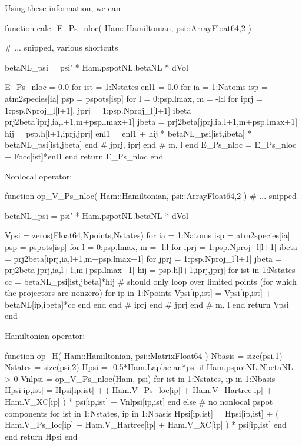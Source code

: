 Using these information, we can
\begin{juliacode}
function calc_E_Ps_nloc( Ham::Hamiltonian, psi::Array{Float64,2} )
  
  # ... snipped, various shortcuts

  betaNL_psi = psi' * Ham.pspotNL.betaNL * dVol

  E_Ps_nloc = 0.0
  for ist = 1:Nstates
    enl1 = 0.0
    for ia = 1:Natoms
      isp = atm2species[ia]
      psp = pspots[isp]
      for l = 0:psp.lmax, m = -l:l
        for iprj = 1:psp.Nproj_l[l+1], jprj = 1:psp.Nproj_l[l+1]
          ibeta = prj2beta[iprj,ia,l+1,m+psp.lmax+1]
          jbeta = prj2beta[jprj,ia,l+1,m+psp.lmax+1]
          hij = psp.h[l+1,iprj,jprj]
          enl1 = enl1 + hij * betaNL_psi[ist,ibeta] * betaNL_psi[ist,jbeta]
        end # jprj, iprj
      end # m, l
    end
    E_Ps_nloc = E_Ps_nloc + Focc[ist]*enl1
  end
  return E_Ps_nloc
end
\end{juliacode}

Nonlocal operator:
\begin{juliacode}
function op_V_Ps_nloc( Ham::Hamiltonian, psi::Array{Float64,2} )
  # ... snipped

  betaNL_psi = psi' * Ham.pspotNL.betaNL * dVol
  
  Vpsi = zeros(Float64,Npoints,Nstates)
  for ia = 1:Natoms
    isp = atm2species[ia]
    psp = pspots[isp]
    for l = 0:psp.lmax, m = -l:l
      for iprj = 1:psp.Nproj_l[l+1]
        ibeta = prj2beta[iprj,ia,l+1,m+psp.lmax+1]
        for jprj = 1:psp.Nproj_l[l+1]
          jbeta = prj2beta[jprj,ia,l+1,m+psp.lmax+1]
          hij = psp.h[l+1,iprj,jprj]
          for ist in 1:Nstates
            cc = betaNL_psi[ist,jbeta]*hij
            # should only loop over limited points (for which the projectors are nonzero)
            for ip in 1:Npoints
              Vpsi[ip,ist] = Vpsi[ip,ist] + betaNL[ip,ibeta]*cc
            end
          end
        end # iprj
      end # jprj
    end # m, l
  end
  return Vpsi
end
\end{juliacode}

Hamiltonian operator:
\begin{juliacode}
function op_H( Ham::Hamiltonian, psi::Matrix{Float64} )
  Nbasis = size(psi,1)
  Nstates = size(psi,2)
  Hpsi = -0.5*Ham.Laplacian*psi
  if Ham.pspotNL.NbetaNL > 0
    Vnlpsi = op_V_Ps_nloc(Ham, psi)
    for ist in 1:Nstates, ip in 1:Nbasis
      Hpsi[ip,ist] = Hpsi[ip,ist] + ( Ham.V_Ps_loc[ip] +
        Ham.V_Hartree[ip] + Ham.V_XC[ip] ) * psi[ip,ist] + Vnlpsi[ip,ist]
    end
  else # no nonlocal pspot components
    for ist in 1:Nstates, ip in 1:Nbasis
      Hpsi[ip,ist] = Hpsi[ip,ist] + ( Ham.V_Ps_loc[ip] +
          Ham.V_Hartree[ip] + Ham.V_XC[ip] ) * psi[ip,ist]
    end
  end
  return Hpsi
end
\end{juliacode}



